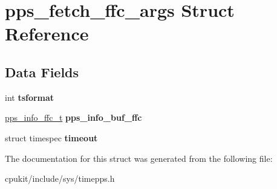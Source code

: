 \hypertarget{structpps__fetch__ffc__args}{}\section{pps\+\_\+fetch\+\_\+ffc\+\_\+args Struct Reference}
\label{structpps__fetch__ffc__args}
\subsection*{Data Fields}
\begin{DoxyCompactItemize}
\item 
\mbox{\label{structpps__fetch__ffc__args_aec1e66ecdd60089137b8f92fc7ac7d2e}} 
int {\bfseries tsformat}
\item 
\mbox{\label{structpps__fetch__ffc__args_a3f956be5e08d23f78e3a54b01ee4f37a}} 
\mbox{\hyperlink{structpps__info__ffc__t}{pps\+\_\+info\+\_\+ffc\+\_\+t}} {\bfseries pps\+\_\+info\+\_\+buf\+\_\+ffc}
\item 
\mbox{\label{structpps__fetch__ffc__args_a7b106b95814cb0c376553b32fbd614d8}} 
struct timespec {\bfseries timeout}
\end{DoxyCompactItemize}


The documentation for this struct was generated from the following file\+:\begin{DoxyCompactItemize}
\item 
cpukit/include/sys/timepps.\+h\end{DoxyCompactItemize}
